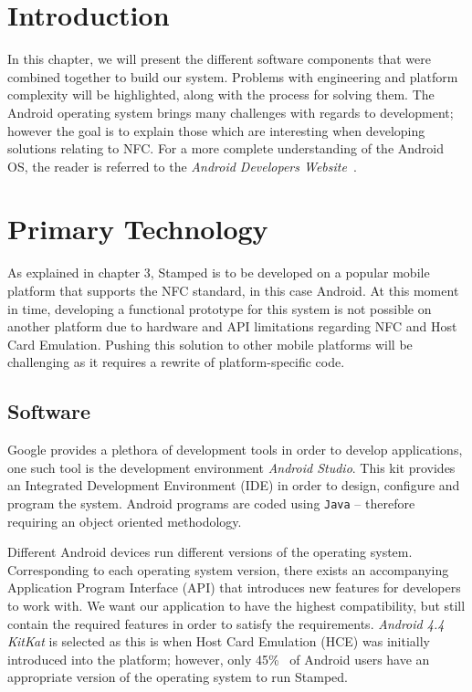 \section{Introduction}
In this chapter, we will present the different software components that were combined together to build our system. Problems with engineering and platform complexity will be highlighted, along with the process for solving them. The Android operating system brings many challenges with regards to development; however the goal is to explain those which are interesting when developing solutions relating to NFC. For a more complete understanding of the Android OS, the reader is referred to the \emph{Android Developers Website}~\cite{androidDeveloper}.

\section{Primary Technology}
As explained in chapter 3, Stamped is to be developed on a popular mobile platform that supports the NFC standard, in this case Android. At this moment in time, developing a functional prototype for this system is not possible on another platform due to hardware and API limitations regarding NFC and Host Card Emulation. Pushing this solution to other mobile platforms will be challenging as it requires a rewrite of platform-specific code.
\subsection{Software}
Google provides a plethora of development tools in order to develop applications, one such tool is the development environment \emph{Android Studio}. This kit provides an Integrated Development Environment (IDE) in order to design, configure and program the system. Android programs are coded using \texttt{Java} -- therefore requiring an object oriented methodology. 

Different Android devices run different versions of the operating system. Corresponding to each operating system version, there exists an accompanying Application Program Interface (API) that introduces new features for developers to work with. We want our application to have the highest compatibility, but still contain the required features in order to satisfy the requirements. \emph{Android 4.4 KitKat} is selected as this is when Host Card Emulation (HCE) was initially introduced into the platform; however, only 45\%~\cite{Androidusagestats} of Android users have an appropriate version of the operating system to run Stamped.

